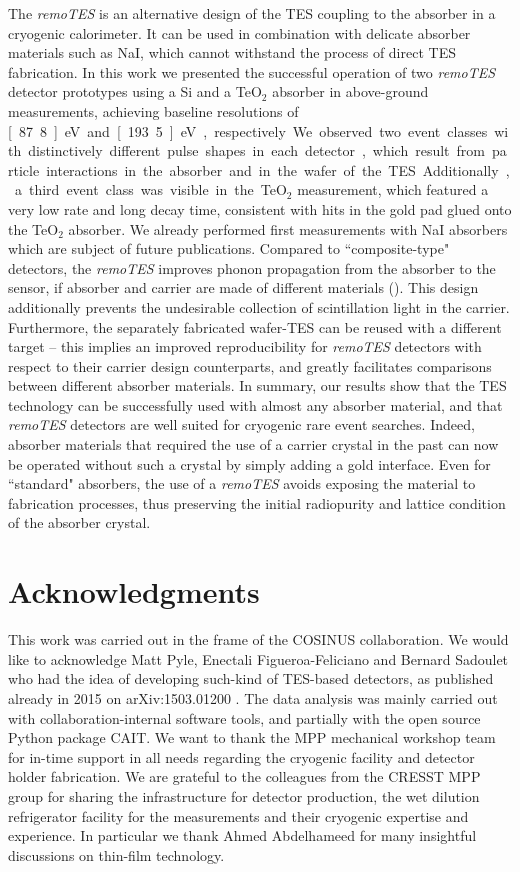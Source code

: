 \documentclass[superscriptaddress,nofootinbib ]{revtex4-2}
\begin{document}
The \textit{remoTES} is an alternative design of the TES coupling to the absorber in a cryogenic calorimeter. It can be used in combination with delicate absorber materials such as NaI, which cannot withstand the process of direct TES fabrication. In this work we presented the successful operation of two \textit{remoTES} detector prototypes using a Si and a TeO$_2$ absorber in above-ground measurements, achieving baseline resolutions of \unit[87.8]{eV} and \unit[193.5]{eV}, respectively. We observed two event classes with distinctively different pulse shapes in each detector, which result from particle interactions in the absorber and in the wafer of the TES. Additionally, a third event class was visible in the TeO$_2$ measurement, which featured a very low rate and long decay time, consistent with hits in the gold pad glued onto the TeO$_2$ absorber. We already performed first measurements with NaI absorbers which are subject of future publications.
Compared to ``composite-type" detectors, the \textit{remoTES} improves phonon propagation from the absorber to the sensor, if absorber and carrier are made of different materials (\cite{schaffner2015particle}). This design additionally prevents the undesirable collection of scintillation light in the carrier. Furthermore, the separately fabricated wafer-TES can be reused with a different target -- this implies an improved reproducibility for \textit{remoTES} detectors with respect to their carrier design counterparts, and greatly facilitates comparisons between different absorber materials. In summary, our results show that the TES technology can be successfully used with almost any absorber material, and that \textit{remoTES} detectors are well suited for cryogenic rare event searches. Indeed, absorber materials that required the use of a carrier crystal in the past can now be operated without such a crystal by simply adding a gold interface. Even for ``standard" absorbers, the use of a \textit{remoTES} avoids exposing the material to fabrication processes, thus preserving the initial radiopurity and lattice condition of the absorber crystal.

\section*{Acknowledgments}
This work was carried out in the frame of the COSINUS collaboration. We would like to acknowledge Matt Pyle, Enectali Figueroa-Feliciano and Bernard Sadoulet who had the idea of developing such-kind of TES-based detectors, as published already in 2015 on arXiv:1503.01200 \cite{pyle2015optimized}. The data analysis was mainly carried out with collaboration-internal software tools, and partially with the open source Python package CAIT\cite{wagner_felix_2021_5091416}. We want to thank the MPP mechanical workshop team for in-time support in all needs regarding the cryogenic facility and detector holder fabrication. We are  grateful to the colleagues from the CRESST MPP group for sharing the infrastructure for detector production, the wet dilution refrigerator facility for the measurements and their cryogenic expertise and experience. In particular we thank Ahmed Abdelhameed for many insightful discussions on thin-film technology. 



\end{document}
